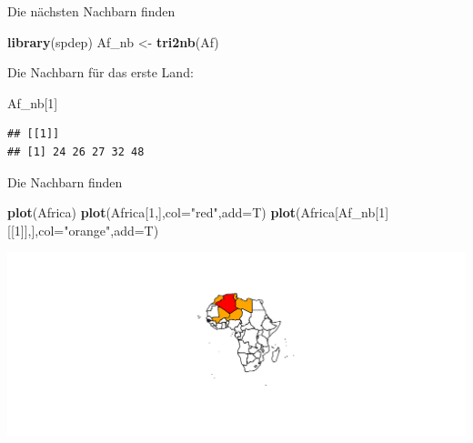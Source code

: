 \documentclass[ignorenonframetext,]{beamer}
\newenvironment{Shaded}{\begin{snugshade}}{\end{snugshade}}
\newcommand{\KeywordTok}[1]{\textcolor[rgb]{0.13,0.29,0.53}{\textbf{#1}}}
\newcommand{\DataTypeTok}[1]{\textcolor[rgb]{0.13,0.29,0.53}{#1}}
\newcommand{\DecValTok}[1]{\textcolor[rgb]{0.00,0.00,0.81}{#1}}
\newcommand{\StringTok}[1]{\textcolor[rgb]{0.31,0.60,0.02}{#1}}
\newcommand{\NormalTok}[1]{#1}
\begin{document}
\begin{frame}[fragile]{Die nächsten Nachbarn finden}

\begin{Shaded}
\begin{Highlighting}[]
\KeywordTok{library}\NormalTok{(spdep)}
\NormalTok{Af_nb <-}\StringTok{ }\KeywordTok{tri2nb}\NormalTok{(Af)}
\end{Highlighting}
\end{Shaded}

Die Nachbarn für das erste Land:

\begin{Shaded}
\begin{Highlighting}[]
\NormalTok{Af_nb[}\DecValTok{1}\NormalTok{]}
\end{Highlighting}
\end{Shaded}

\begin{verbatim}
## [[1]]
## [1] 24 26 27 32 48
\end{verbatim}

\end{frame}

\begin{frame}[fragile]{Die Nachbarn finden}

\begin{Shaded}
\begin{Highlighting}[]
\KeywordTok{plot}\NormalTok{(Africa)}
\KeywordTok{plot}\NormalTok{(Africa[}\DecValTok{1}\NormalTok{,],}\DataTypeTok{col=}\StringTok{"red"}\NormalTok{,}\DataTypeTok{add=}\NormalTok{T)}
\KeywordTok{plot}\NormalTok{(Africa[Af_nb[}\DecValTok{1}\NormalTok{][[}\DecValTok{1}\NormalTok{]],],}\DataTypeTok{col=}\StringTok{"orange"}\NormalTok{,}\DataTypeTok{add=}\NormalTok{T)}
\end{Highlighting}
\end{Shaded}

\includegraphics{slides_all2gether_part1_files/figure-beamer/unnamed-chunk-170-1.pdf}

\end{frame}
\end{document}
